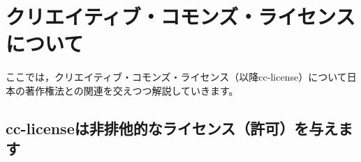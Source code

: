 \documentclass{ltjsarticle}
\title{\textgt{クリエイティブ・コモンズ・ライセンスについて}}
\author{Spiegel}
\date{2014-09-11}
\begin{document}
\maketitle
\tableofcontents
\clearpage

\section{クリエイティブ・コモンズ・ライセンスについて}

ここでは，クリエイティブ・コモンズ・ライセンス（以降cc-license）について日本の著作権法との関連を交えつつ解説していきます。

\subsection{cc-licenseは非排他的なライセンス（許可）を与えます}
\end{document}

